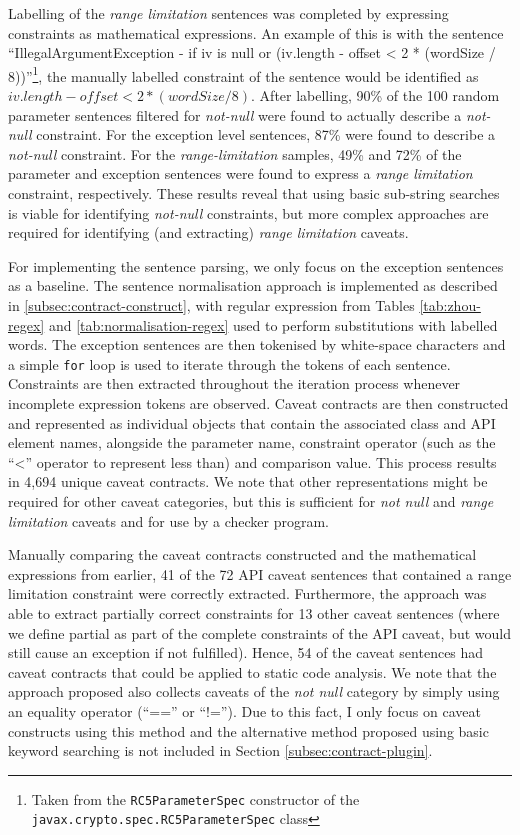 Labelling of the \textit{range limitation} sentences was completed by expressing constraints as mathematical expressions. An example of this is with the sentence ``IllegalArgumentException - if iv is null or (iv.length - offset < 2 * (wordSize / 8))''\footnote{ Taken from the \lstinline{RC5ParameterSpec} constructor of the \lstinline{javax.crypto.spec.RC5ParameterSpec} class}, the manually labelled constraint of the sentence would be identified as $iv.length-offset<2*(wordSize/8)$. After labelling, 90\% of the 100 random parameter sentences filtered for \textit{not-null} were found to actually describe a \textit{not-null} constraint. For the exception level sentences, 87\% were found to describe a \textit{not-null} constraint. For the \textit{range-limitation} samples, 49\% and 72\% of the parameter and exception sentences were found to express a \textit{range limitation} constraint, respectively. These results reveal that using basic sub-string searches is viable for identifying \textit{not-null} constraints, but more complex approaches are required for identifying (and extracting) \textit{range limitation} caveats. \bigbreak

For implementing the sentence parsing, we only focus on the exception sentences as a baseline. The sentence normalisation approach is implemented as described in \ref{subsec:contract-construct}, with regular expression from Tables \ref{tab:zhou-regex} and \ref{tab:normalisation-regex} used to perform substitutions with labelled words. The exception sentences are then tokenised by white-space characters and a simple \lstinline{for} loop is used to iterate through the tokens of each sentence. Constraints are then extracted throughout the iteration process whenever incomplete expression tokens are observed. Caveat contracts are then constructed and represented as individual objects that contain the associated class and API element names, alongside the parameter name, constraint operator (such as the ``<'' operator to represent less than) and comparison value. This process results in 4,694 unique caveat contracts. We note that other representations might be required for other caveat categories, but this is sufficient for \textit{not null} and \textit{range limitation} caveats and for use by a checker program. \bigbreak

Manually comparing the caveat contracts constructed and the mathematical expressions from earlier, 41 of the 72 API caveat sentences that contained a range limitation constraint were correctly extracted. Furthermore, the approach was able to extract partially correct constraints for 13 other caveat sentences (where we define partial as part of the complete constraints of the API caveat, but would still cause an exception if not fulfilled). Hence, 54 of the caveat sentences had caveat contracts that could be applied to static code analysis. We note that the approach proposed also collects caveats of the \textit{not null} category by simply using an equality operator (``=='' or ``!=''). Due to this fact, I only focus on caveat constructs using this method and the alternative method proposed using basic keyword searching is not included in Section \ref{subsec:contract-plugin}. \\


